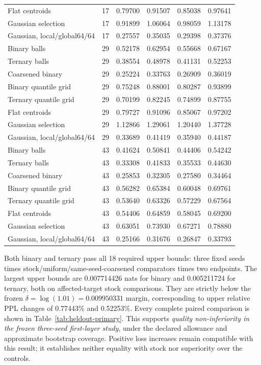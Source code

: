 \documentclass[11pt]{article}
\begin{document}
\begin{table}[p]
\begin{tabular}{lrrrrr}
Flat centroids & 17 & 0.79700 & 0.91507 & 0.85038 & 0.97641 \\
Gaussian selection & 17 & 0.91899 & 1.06064 & 0.98059 & 1.13178 \\
Gaussian, local/global64/64 & 17 & 0.27557 & 0.35035 & 0.29398 & 0.37376 \\
\midrule
Binary balls & 29 & 0.52178 & 0.62954 & 0.55668 & 0.67167 \\
Ternary balls & 29 & 0.38554 & 0.48978 & 0.41131 & 0.52253 \\
Coarsened binary & 29 & 0.25224 & 0.33763 & 0.26909 & 0.36019 \\
Binary quantile grid & 29 & 0.75248 & 0.88001 & 0.80287 & 0.93899 \\
Ternary quantile grid & 29 & 0.70199 & 0.82245 & 0.74899 & 0.87755 \\
Flat centroids & 29 & 0.79727 & 0.91096 & 0.85067 & 0.97202 \\
Gaussian selection & 29 & 1.12866 & 1.29061 & 1.20440 & 1.37728 \\
Gaussian, local/global64/64 & 29 & 0.33689 & 0.41419 & 0.35940 & 0.44187 \\
\midrule
Binary balls & 43 & 0.41624 & 0.50841 & 0.44406 & 0.54242 \\
Ternary balls & 43 & 0.33308 & 0.41833 & 0.35533 & 0.44630 \\
Coarsened binary & 43 & 0.25853 & 0.32305 & 0.27580 & 0.34464 \\
Binary quantile grid & 43 & 0.56282 & 0.65384 & 0.60048 & 0.69761 \\
Ternary quantile grid & 43 & 0.53640 & 0.63326 & 0.57229 & 0.67564 \\
Flat centroids & 43 & 0.54406 & 0.64859 & 0.58045 & 0.69200 \\
Gaussian selection & 43 & 0.63051 & 0.73930 & 0.67271 & 0.78880 \\
Gaussian, local/global64/64 & 43 & 0.25166 & 0.31676 & 0.26847 & 0.33793 \\
\bottomrule
\end{tabular}
\end{table}

Both binary and ternary pass all 18 required upper bounds: three fixed seeds
times stock/uniform/same-seed-coarsened comparators times two endpoints.
The largest upper bounds are 0.007714426 nats for binary and 0.005211724
for ternary, both on affected-target stock comparisons. They are strictly
below the frozen \(\delta=\log(1.01)=0.009950331\) margin, corresponding
to upper relative PPL changes of 0.77443\% and 0.52253\%.
Every complete paired comparison is shown in Table~\ref{tab:heldout-primary}.
This supports \emph{quality non-inferiority in the frozen three-seed
first-layer study}, under the declared allowance and approximate bootstrap
coverage. Positive loss increases remain compatible with this result;
it establishes neither equality with stock nor superiority over the controls.
\end{document}
